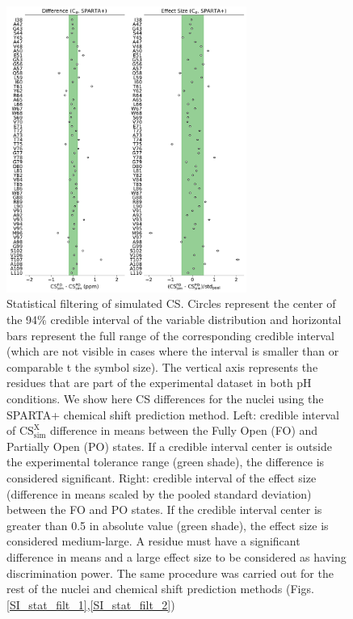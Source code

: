 \documentclass[%
 aip,
 amsmath,amssymb,
 preprint,%
]{revtex4-1}
\newcommand{\ca}{\ce{C_\alpha} }
\begin{document}
\begin{figure}[tbp]
\includegraphics[width=0.7\textwidth]{figures/statistical_filtering_skew_model_sparta_plus_main.pdf}%
\caption{\label{Fig3} \scriptsize
    Statistical filtering of simulated CS.  Circles represent the center of the 94$\%$ credible interval of the variable distribution and horizontal bars represent the full range of the corresponding credible interval (which are not visible in cases where the interval is smaller than or comparable t the symbol size). The vertical axis represents the residues that are part of the experimental dataset in both pH conditions. We show here CS differences for the \ca nuclei using the SPARTA+ chemical shift prediction method. Left: credible interval of $\text{CS}_{\text{sim}}^{\text{X}}$ difference in means between the Fully Open (FO) and Partially Open (PO) states. If a credible interval center is outside the experimental tolerance range (green shade), the difference is considered significant. Right: credible interval of the effect size (difference in means scaled by the pooled standard deviation) between the FO and PO states. If the credible interval center is greater than 0.5 in absolute value (green shade), the effect size is considered medium-large\cite{Sawilowsky2009}. A residue must have a significant difference in means and a large effect size to be considered as having discrimination power. The same procedure was carried out for the rest of the nuclei and chemical shift prediction methods (Figs. \ref{SI_stat_filt_1},\ref{SI_stat_filt_2})}
\end{figure}
\end{document}
